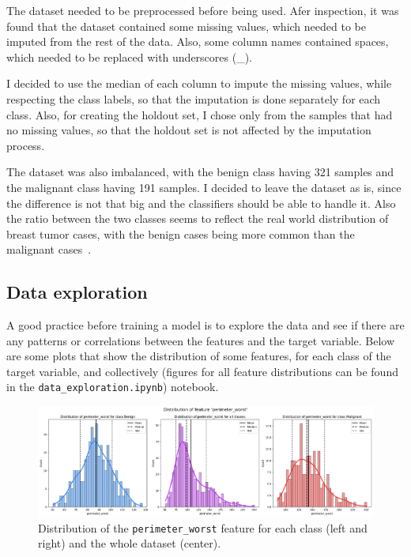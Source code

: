 \documentclass[12pt]{article}
\begin{document}
The dataset needed to be preprocessed before being used. Afer inspection, it was
found that the dataset contained some missing values, which needed to be
imputed from the rest of the data. Also, some column names contained spaces,
which needed to be replaced with underscores (\_).

I decided to use the median of each column to impute the missing values, while
respecting the class labels, so that the imputation is done separately for each
class. Also, for creating the holdout set, I chose only from the samples that
had no missing values, so that the holdout set is not affected by the imputation
process.

The dataset was also imbalanced, with the benign class having 321 samples and
the malignant class having 191 samples. I decided to leave the dataset as is,
since the difference is not that big and the classifiers should be able to
handle it. Also the ratio between the two classes seems to reflect the real
world distribution of breast tumor cases, with the benign cases being more
common than the malignant cases~\cite{%
Ugiagbe_Olu-Eddo_2011,Bhathal_Brown_Lesueur_Russell_1985}.


\subsection{Data exploration}

A good practice before training a model is to explore the data and see if there
are any patterns or correlations between the features and the target variable.
Below are some plots that show the distribution of some features, for each class
of the target variable, and collectively (figures for all feature distributions
can be found in the \texttt{data\_exploration.ipynb}) notebook.

\begin{figure}[H]
    \centering
    \includegraphics[width=\textwidth]{ims/perimeter_worst.png}
    \caption{Distribution of the \texttt{perimeter\_worst} feature for each
    class (left and right) and the whole dataset (center).}
    \label{fig:perimeter_worst}
\end{figure}
\end{document}
